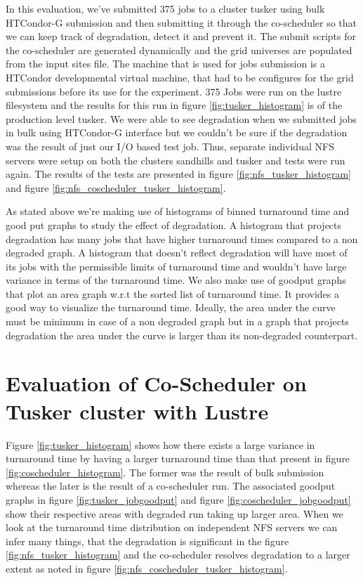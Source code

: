 \documentclass[ms,electronic,double]{nuthesis}
\begin{document}
In this evaluation, we've submitted 375 jobs to a cluster tusker using bulk 
HTCondor-G submission and then submitting it through the co-scheduler so that we 
can keep track of degradation, detect it and prevent it. The submit scripts for 
the co-scheduler are generated dynamically and the grid universes are populated 
from the input sites file. The machine that is used for jobs submission is a 
HTCondor developmental virtual machine, that had to be configures for the grid 
submissions before its use for the experiment. 375 Jobs were run on the lustre 
filesystem and the results for this run in figure \ref{fig:tusker_histogram} is 
of the production level tusker. We were able to see degradation when we 
submitted jobs in bulk using HTCondor-G interface but we couldn't be sure if the 
degradation was the result of just our I/O based test job. Thus, separate 
individual NFS servers were setup on both the clusters sandhills and tusker and 
tests were run again. The results of the tests are presented in figure \ref{fig:nfs_tusker_histogram} 
and figure \ref{fig:nfs_coscheduler_tusker_histogram}.

As stated above we're making use of histograms of binned turnaround time and good 
put graphs to study the effect of degradation. A histogram that projects 
degradation has many jobs that have higher turnaround times compared to a non 
degraded graph. A histogram that doesn't reflect degradation will have most of 
its jobs with the permissible limits of turnaround time and wouldn't have large 
variance in terms of the turnaround time. We also make use of goodput graphs 
that plot an area graph w.r.t the sorted list of turnaround time. It provides a good way to 
visualize the turnaround time. Ideally, the area under the curve must be minimum 
in case of a non degraded graph but in a graph that projects degradation the 
area under the curve is larger than its non-degraded counterpart.
\newpage
\section{Evaluation of Co-Scheduler on Tusker cluster with Lustre}
Figure \ref{fig:tusker_histogram} shows how there exists a large variance in 
turnaround time by having a larger turnaround time than that present in figure 
\ref{fig:coscheduler_histogram}. The former was the result of bulk submission 
whereas the later is the result of a co-scheduler run. The associated goodput 
graphs in figure \ref{fig:tusker_jobgoodput} and figure \ref{fig:coscheduler_jobgoodput} 
show their respective areas with degraded run taking up larger area. When we look 
at the turnaround time distribution on independent NFS servers we can infer many 
things, that the degradation is significant in the figure \ref{fig:nfs_tusker_histogram} and the co-scheduler 
resolves degradation to a larger extent as noted in figure 
\ref{fig:nfs_coscheduler_tusker_histogram}.
\end{document}
